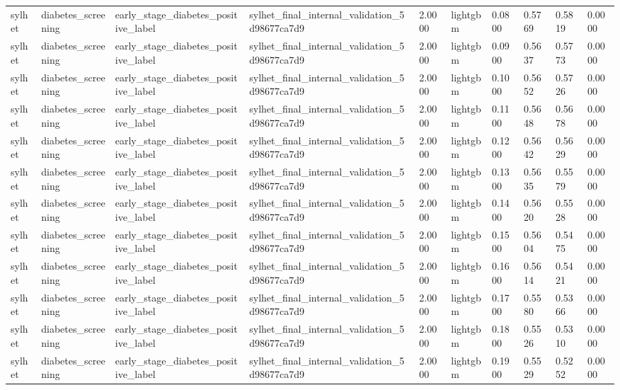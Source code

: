 \begin{tabular}{llllllllll}
sylhet & diabetes\_screening & early\_stage\_diabetes\_positive\_label & sylhet\_final\_internal\_validation\_5d98677ca7d9 & 2.0000 & lightgbm & 0.0800 & 0.5769 & 0.5819 & 0.0000 \\
sylhet & diabetes\_screening & early\_stage\_diabetes\_positive\_label & sylhet\_final\_internal\_validation\_5d98677ca7d9 & 2.0000 & lightgbm & 0.0900 & 0.5637 & 0.5773 & 0.0000 \\
sylhet & diabetes\_screening & early\_stage\_diabetes\_positive\_label & sylhet\_final\_internal\_validation\_5d98677ca7d9 & 2.0000 & lightgbm & 0.1000 & 0.5652 & 0.5726 & 0.0000 \\
sylhet & diabetes\_screening & early\_stage\_diabetes\_positive\_label & sylhet\_final\_internal\_validation\_5d98677ca7d9 & 2.0000 & lightgbm & 0.1100 & 0.5648 & 0.5678 & 0.0000 \\
sylhet & diabetes\_screening & early\_stage\_diabetes\_positive\_label & sylhet\_final\_internal\_validation\_5d98677ca7d9 & 2.0000 & lightgbm & 0.1200 & 0.5642 & 0.5629 & 0.0000 \\
sylhet & diabetes\_screening & early\_stage\_diabetes\_positive\_label & sylhet\_final\_internal\_validation\_5d98677ca7d9 & 2.0000 & lightgbm & 0.1300 & 0.5635 & 0.5579 & 0.0000 \\
sylhet & diabetes\_screening & early\_stage\_diabetes\_positive\_label & sylhet\_final\_internal\_validation\_5d98677ca7d9 & 2.0000 & lightgbm & 0.1400 & 0.5620 & 0.5528 & 0.0000 \\
sylhet & diabetes\_screening & early\_stage\_diabetes\_positive\_label & sylhet\_final\_internal\_validation\_5d98677ca7d9 & 2.0000 & lightgbm & 0.1500 & 0.5604 & 0.5475 & 0.0000 \\
sylhet & diabetes\_screening & early\_stage\_diabetes\_positive\_label & sylhet\_final\_internal\_validation\_5d98677ca7d9 & 2.0000 & lightgbm & 0.1600 & 0.5614 & 0.5421 & 0.0000 \\
sylhet & diabetes\_screening & early\_stage\_diabetes\_positive\_label & sylhet\_final\_internal\_validation\_5d98677ca7d9 & 2.0000 & lightgbm & 0.1700 & 0.5580 & 0.5366 & 0.0000 \\
sylhet & diabetes\_screening & early\_stage\_diabetes\_positive\_label & sylhet\_final\_internal\_validation\_5d98677ca7d9 & 2.0000 & lightgbm & 0.1800 & 0.5526 & 0.5310 & 0.0000 \\
sylhet & diabetes\_screening & early\_stage\_diabetes\_positive\_label & sylhet\_final\_internal\_validation\_5d98677ca7d9 & 2.0000 & lightgbm & 0.1900 & 0.5529 & 0.5252 & 0.0000 \\

\end{tabular}
